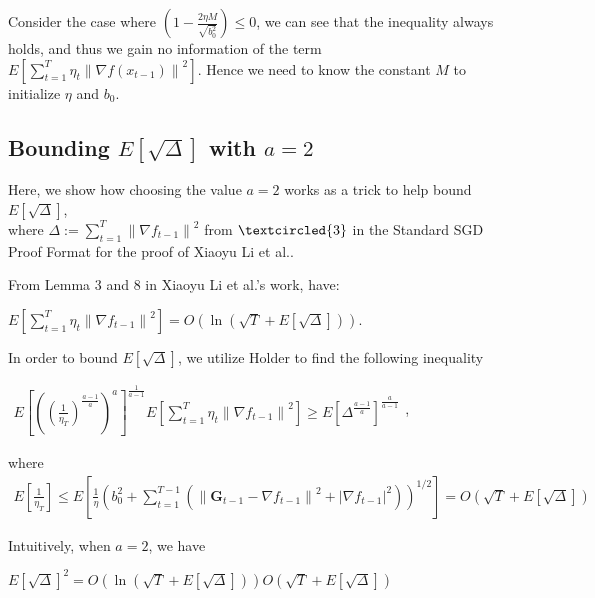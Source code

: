 \documentclass[14pt,onecolumn,letterpaper]{extarticle}
\begin{document}
Consider the case where $\left(1-\frac{2 \eta M}{\sqrt{b_0^2}}\right) \leq 0$, we can see that the inequality always holds, and thus we gain no information of the term $E\left[\sum_{t=1}^T \eta_t\left\|\nabla f\left(x_{t-1}\right)\right\|^2\right]$. Hence we need to know the constant $M$ to initialize $\eta$ and $b_0$.

\subsection{Bounding $E\left[\sqrt{\Delta}\right]$ with $a = 2$}
Here, we show how choosing the value $a = 2$ works as a trick to help bound $E\left[\sqrt{\Delta}\right]$,\\ where $\Delta:=\sum_{t=1}^T\left\|\nabla f_{t-1}\right\|^2$ from $\textcircled{3}$ in the Standard SGD Proof Format for the proof of Xiaoyu Li et al.. \par
From Lemma 3 and 8 in Xiaoyu Li et al.'s work, have:
\par\vspace{3mm}
$E\left[\sum_{t=1}^T \eta_t\left\|\nabla f_{t-1}\right\|^2\right] = O\left( \ln \left(\sqrt{T}+ E\left[\sqrt{\Delta}\right]\right)\right).$
\par\vspace{3mm}
In order to bound $E\left[\sqrt{\Delta}\right]$,  we utilize Holder to find the following inequality
\par\vspace{3mm}
$\begin{aligned} E\left[\left(\left(\frac{1}{\eta_T}\right)^{\frac{a-1}{a}}\right)^{a}\right]^{\frac{1}{a-1}}E\left[\sum_{t=1}^T \eta_t\left\|\nabla f_{t-1}\right\|^2\right] \geq E\left[\Delta^{\frac{a-1}{a}}\right]^{\frac{a}{a-1}}\end{aligned}$, 
\par\vspace{3mm}
where
\begin{align*}
E\left[\frac{1}{\eta_T}\right]
\leq
E\left[\frac{1}{\eta}\left(b_0^2+\sum_{t=1}^{T-1}\left(\left\|\boldsymbol{G}_{t-1}-\nabla f_{t-1} \right\|^2+\left|\nabla f_{t-1}\right|^2\right)\right)^{1 / 2}\right] 
=
O\left(\sqrt{T}+ E\left[\sqrt{\Delta}\right]\right)
\end{align*}
\par\vspace{3mm}
Intuitively, when $a = 2$, we have \par\vspace{3mm}
$E\left[\sqrt{\Delta}\right]^{2} = O\left( \ln \left(\sqrt{T}+ E\left[\sqrt{\Delta}\right]\right)\right)O\left(\sqrt{T}+ E\left[\sqrt{\Delta}\right]\right)$
\end{document}
